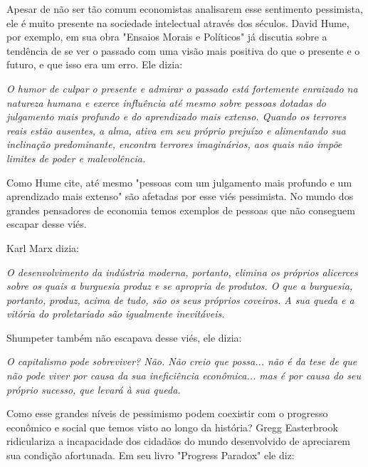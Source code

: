 Apesar de não ser tão comum economistas analisarem esse sentimento pessimista, ele é muito presente na sociedade intelectual através dos séculos. David Hume, por exemplo, em sua obra "Ensaios Morais e Políticos" já discutia sobre a tendência de se ver o passado com uma visão mais positiva do que o presente e o futuro, e que isso era um erro. Ele dizia:

\begin{citacao}
    \textit{
        O humor de culpar o presente e admirar o passado está fortemente enraizado na natureza humana e exerce influência até mesmo sobre pessoas dotadas do julgamento mais profundo e do aprendizado mais extenso. \newline
        Quando os terrores reais estão ausentes, a alma, ativa em seu próprio prejuízo e alimentando sua inclinação predominante, encontra terrores imaginários, aos quais não impõe limites de poder e malevolência.
    } \newline
    \cite{Hume1875}
\end{citacao}

Como Hume cite, até mesmo "pessoas com um julgamento mais profundo e um aprendizado mais extenso" são afetadas por esse viés pessimista. No mundo dos grandes pensadores de economia temos exemplos de pessoas que não conseguem escapar desse viés. 

Karl Marx dizia:

\begin{citacao}
    \textit{
        O desenvolvimento da indústria moderna, portanto, elimina os próprios alicerces sobre os quais a burguesia produz e se apropria de produtos. O que a burguesia, portanto, produz, acima de tudo, são os seus próprios coveiros. A sua queda e a vitória do proletariado são igualmente inevitáveis.
    } \newline
    \cite{marx1988communist}
\end{citacao}

Shumpeter também não escapava desse viés, ele dizia:

\begin{citacao}
    \textit{
        O capitalismo pode sobreviver? Não. Não creio que possa... não é da tese de que não pode viver por causa da sua ineficiência econômica... mas é por causa do seu próprio sucesso, que levará à sua queda.
    } \newline
    \cite{schumpeter1976capitalism}
\end{citacao}

Como esse grandes níveis de pessimismo podem coexistir com o progresso econômico e social que temos visto ao longo da história? Gregg Easterbrook ridiculariza  a incapacidade dos cidadãos do mundo desenvolvido de apreciarem sua condição afortunada. Em seu livro "Progress Paradox" ele diz:

